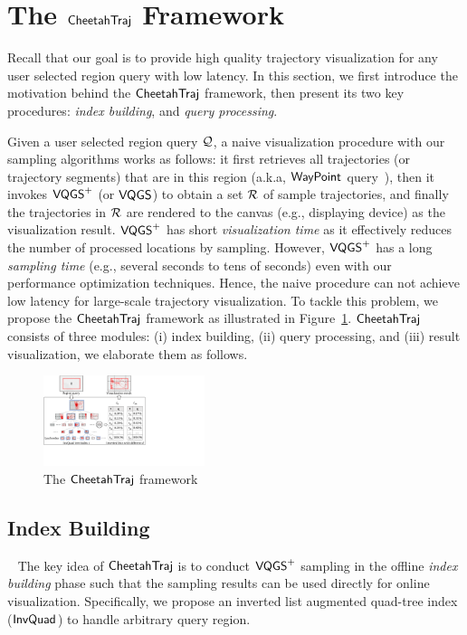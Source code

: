 \section{The $\mathsf{CheetahTraj}$ Framework}\label{sec:cheetahtraj}
Recall that our goal is to provide high quality trajectory visualization for any user selected region query with low latency.
In this section, we first introduce the motivation behind the $\mathsf{CheetahTraj}$ framework, then present its two key procedures: \textit{index building}, and \textit{query processing}.

Given a user selected region query $\mathcal{Q}$, a naive visualization procedure with our sampling algorithms works as follows:
it first retrieves all trajectories (or trajectory segments) that are in this region (a.k.a, $\mathsf{WayPoint}$ query~\cite{kruger2013trajectorylenses}),
then it invokes $\mathsf{VQGS}^+$ (or $\mathsf{VQGS}$) to obtain a set $\mathcal{R}$ of sample trajectories, and finally the trajectories in $\mathcal{R}$ are rendered to the canvas (e.g., displaying device) as the visualization result.
$\mathsf{VQGS}^+$ has short \textit{visualization time} as it effectively reduces the number of processed locations by sampling. However, $\mathsf{VQGS}^+$ has a long \textit{sampling time} (e.g., several seconds to tens of seconds) even with our performance optimization techniques.
Hence, the naive procedure can not achieve low latency for large-scale trajectory visualization. To tackle this problem, we propose the $\mathsf{CheetahTraj}$ framework as illustrated in Figure~\ref{fig:framework}.  $\mathsf{CheetahTraj}$ consists of three modules: (i) \textsf{index building}, (ii) \textsf{query processing}, and (iii) \textsf{result visualization}, we elaborate them as follows.


\begin{figure}
	\centering
	\includegraphics[width=0.42\textwidth]{pictures/cheetahtraj}
    \trim
    \caption{The $\mathsf{CheetahTraj}$ framework}
    \label{fig:framework}
    \trim
\end{figure}


\subsection{Index Building}~\label{sec:index}
The key idea of $\mathsf{CheetahTraj}$ is to conduct $\mathsf{VQGS}^+$ sampling in the offline \emph{index building} phase such that the sampling results can be used directly for online visualization.
Specifically, we propose an inverted list augmented quad-tree index ($\mathsf{InvQuad}$) to handle arbitrary query region.

